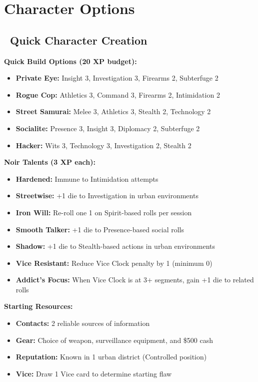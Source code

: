 \documentclass[11pt]{article}
\begin{document}
\newpage

\section{Character Options}

\subsection*{\faUser\ Quick Character Creation}

\textbf{Quick Build Options (20 XP budget):}
\begin{itemize}
    \item \textbf{Private Eye:} Insight 3, Investigation 3, Firearms 2, Subterfuge 2
    \item \textbf{Rogue Cop:} Athletics 3, Command 3, Firearms 2, Intimidation 2
    \item \textbf{Street Samurai:} Melee 3, Athletics 3, Stealth 2, Technology 2
    \item \textbf{Socialite:} Presence 3, Insight 3, Diplomacy 2, Subterfuge 2
    \item \textbf{Hacker:} Wits 3, Technology 3, Investigation 2, Stealth 2
\end{itemize}

\textbf{Noir Talents (3 XP each):}
\begin{itemize}
    \item \textbf{Hardened:} Immune to Intimidation attempts
    \item \textbf{Streetwise:} +1 die to Investigation in urban environments
    \item \textbf{Iron Will:} Re-roll one 1 on Spirit-based rolls per session
    \item \textbf{Smooth Talker:} +1 die to Presence-based social rolls
    \item \textbf{Shadow:} +1 die to Stealth-based actions in urban environments
    \item \textbf{Vice Resistant:} Reduce Vice Clock penalty by 1 (minimum 0)
    \item \textbf{Addict's Focus:} When Vice Clock is at 3+ segments, gain +1 die to related rolls
\end{itemize}

\textbf{Starting Resources:}
\begin{itemize}
    \item \textbf{Contacts:} 2 reliable sources of information
    \item \textbf{Gear:} Choice of weapon, surveillance equipment, and \$500 cash
    \item \textbf{Reputation:} Known in 1 urban district (Controlled position)
    \item \textbf{Vice:} Draw 1 Vice card to determine starting flaw
\end{itemize}
\end{document}
